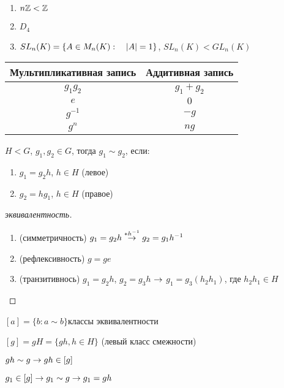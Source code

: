 \documentclass[main, 12pt, fleqn]{subfiles}
\begin{document}
\begin{examples}
    \begin{enumerate}                               
    	\item $n\mathbb{Z} < \mathbb{Z}$
    	\item $D_4$
    	\item $SL_n(K)=\{A \in M_n(K): \quad |A|=1\}$, $SL_n(K)<GL_n(K)$
	\end{enumerate} 
\end{examples}

\begin{tabular} {c|c}
	Мультипликативная запись & Аддитивная запись\\ \hline 
	$g_1 g_2$ & $g_1 + g_2$\\
	$e$ & $0$\\
	$g^{-1}$ & $-g$\\
    $g^n$ & $ng$ 
\end{tabular}

\begin{definition}
    $H<G$, $g_1,g_2 \in G$, тогда $g_1 \sim g_2$, если:
    \begin{enumerate}                               
    	\item $g_1=g_2 h$, $h \in H$ (левое)
    	\item $g_2=h g_1$, $h \in H$ (правое)
	\end{enumerate} 
\end{definition}

\begin{proof}[эквивалентность]
    \begin{enumerate}                               
    	\item (симметричность) $g_1=g_2 h \overset{*h^{-1}}{\rightarrow} g_2 = g_1 h^{-1}$
    	\item (рефлексивность) $g=ge$
    	\item (транзитивнось) $g_1=g_2 h$, $g_2 = g_3 h$ $\rightarrow$ $g_1=g_3(h_2 h_1)$, где $h_2 h_1 \in H$
	\end{enumerate} 
\end{proof}

\begin{definition}
    $[a] = \{b:a∼b\}$классы эквивалентности
\end{definition}

\begin{definition}
    $[g] = g H = \{g h, h \in H \}$ (левый класс смежности) 
    
    $g h \sim g \rightarrow g h \in [g]$
    
    $g_1 \in [g] \rightarrow g_1 \sim g \rightarrow g_1 = g h$
\end{definition}
\end{document}
